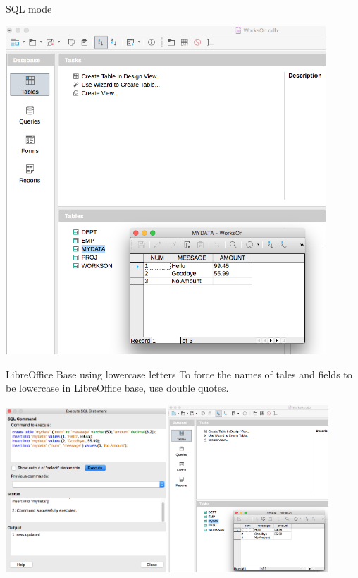 \documentclass[xcolor=svgnames]{beamer}
\theoremstyle{example}
\begin{document}
\begin{frame}{SQL mode}
\begin{center}
\includegraphics[width=0.9\textwidth]{img/mydataBASE}
\end{center}
\end{frame}


\begin{frame}{LibreOffice Base using lowercase letters}
To force the names of tales and fields to be lowercase in LibreOffice base, use double quotes.
\begin{center}
\includegraphics[width=0.45\textwidth]{img/baseLoserSQL.png} \quad
\includegraphics[width=0.45\textwidth]{img/baseLower}
\end{center}
\end{frame}
\end{document}
